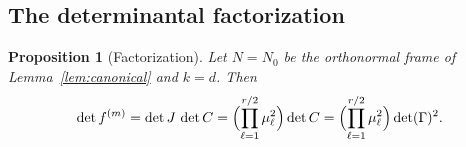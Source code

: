 \documentclass[12pt]{article}
\theoremstyle{plain}
\newtheorem{proposition}[theorem]{Proposition}
\theoremstyle{definition}
\theoremstyle{remark}
\begin{document}
	\subsection{The determinantal factorization}
	\label{sec:factorization}
	
	\begin{proposition}[Factorization]
		\label{prop:factorization}
		Let $N=N_{0}$ be the orthonormal frame of Lemma~\ref{lem:canonical} and $k=d$.
		Then
		\begin{equation}
			\det f^{(m)}
			=\det J\,\det C
			=\Bigl(\prod_{\ell=1}^{r/2}\mu_{\ell}^{2}\Bigr)\det C
			=\Bigl(\prod_{\ell=1}^{r/2}\mu_{\ell}^{2}\Bigr)\det(\Gamma)^{2}.
			\label{eq:factorization}
		\end{equation}
	\end{proposition}
	
\end{document}
